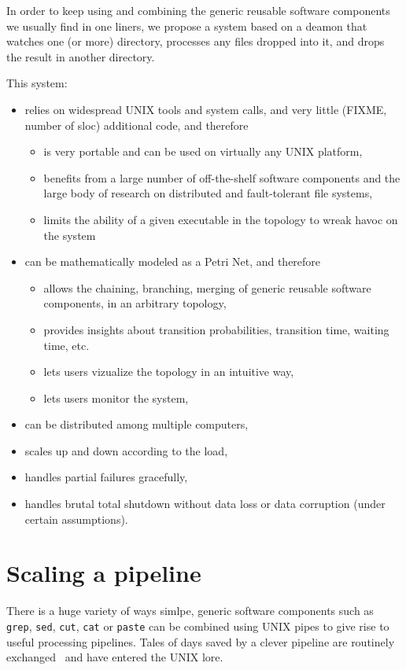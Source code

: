 \documentclass[letterpaper,twocolumn,10pt]{article}
\begin{document}
In order to keep using and combining the generic reusable software components we usually find in one liners, we propose a system based on a deamon that watches one (or more) directory, processes any files dropped into it, and drops the result in another directory.

This system:
\begin{itemize}
\item relies on widespread UNIX tools and system calls, and very little (FIXME, number of sloc) additional code, and therefore
\begin{itemize}
\item is very portable and can be used on virtually any UNIX platform,
\item benefits from a large number of off-the-shelf software components and the large body of research on distributed and fault-tolerant file systems,
\item limits the ability of a given executable in the topology to wreak havoc on the system
\end{itemize}
\item can be mathematically modeled as a Petri Net, and therefore
\begin{itemize}
\item allows the chaining, branching, merging of generic reusable software components, in an arbitrary topology,
\item provides insights about transition probabilities, transition time, waiting time, etc.
\item lets users vizualize the topology in an intuitive way,
\item lets users monitor the system,
\end{itemize}
\item can be distributed among multiple computers,
\item scales up and down according to the load,
\item handles partial failures gracefully,
\item handles brutal total shutdown without data loss or data corruption (under certain assumptions).
\end{itemize}
\section{Scaling a pipeline}

There is a huge variety of ways simlpe, generic software components such as {\tt grep}, {\tt sed}, {\tt cut}, {\tt cat} or {\tt paste} can be combined using UNIX pipes to give rise to useful processing pipelines. Tales of days saved by a clever pipeline are routinely exchanged~\cite{ddos,ping} and have entered the UNIX lore.
\end{document}
